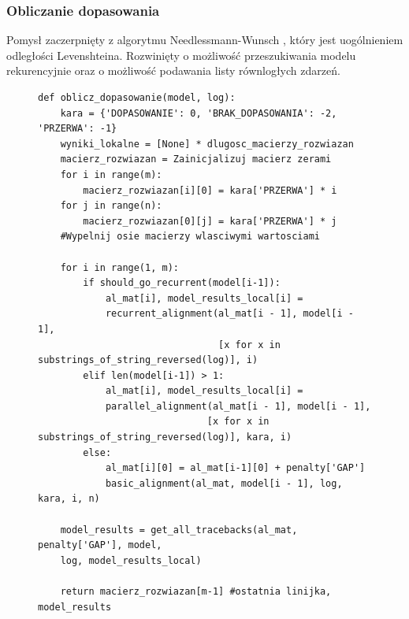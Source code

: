 \subsubsection{Obliczanie dopasowania}
Pomysł zaczerpnięty z algorytmu Needlessmann-Wunsch \cite{ea252fd3937a4a309a5e07e61e5531a7}, który jest uogólnieniem odległości Levenshteina. Rozwinięty o możliwość przeszukiwania modelu rekurencyjnie oraz o możliwość podawania listy równlogłych zdarzeń.
\begin{figure}[!ht]
\lstset{caption=Obliczanie dopasowania, captionpos=b}
\lstset{label=src:alignment_calculation, frame=single}
\begin{lstlisting}
def oblicz_dopasowanie(model, log):
    kara = {'DOPASOWANIE': 0, 'BRAK_DOPASOWANIA': -2, 'PRZERWA': -1}
    wyniki_lokalne = [None] * dlugosc_macierzy_rozwiazan
    macierz_rozwiazan = Zainicjalizuj macierz zerami
    for i in range(m):
        macierz_rozwiazan[i][0] = kara['PRZERWA'] * i
    for j in range(n):
        macierz_rozwiazan[0][j] = kara['PRZERWA'] * j
    #Wypelnij osie macierzy wlasciwymi wartosciami

    for i in range(1, m):
        if should_go_recurrent(model[i-1]):
            al_mat[i], model_results_local[i] = 
            recurrent_alignment(al_mat[i - 1], model[i - 1],
                                [x for x in substrings_of_string_reversed(log)], i)
        elif len(model[i-1]) > 1:
            al_mat[i], model_results_local[i] = 
            parallel_alignment(al_mat[i - 1], model[i - 1],
                              [x for x in substrings_of_string_reversed(log)], kara, i)
        else:
            al_mat[i][0] = al_mat[i-1][0] + penalty['GAP']
            basic_alignment(al_mat, model[i - 1], log, kara, i, n)

    model_results = get_all_tracebacks(al_mat, penalty['GAP'], model, 
    log, model_results_local)

    return macierz_rozwiazan[m-1] #ostatnia linijka, model_results
\end{lstlisting}
\end{figure}

